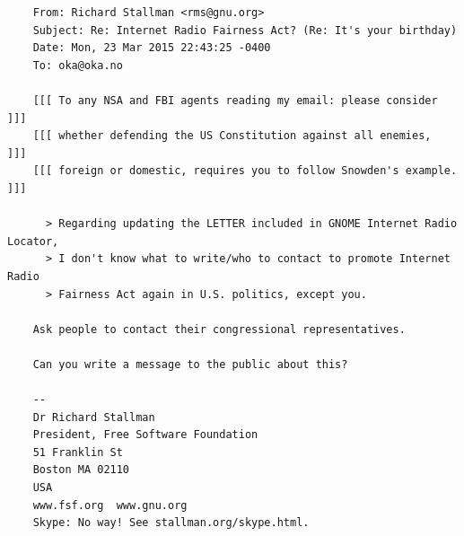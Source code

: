 \documentclass[20pt,landscape]{foils}
\begin{document}
\begin{list1}
\item
  \begin{tiny}
\begin{verbatim}
    From: Richard Stallman <rms@gnu.org>
    Subject: Re: Internet Radio Fairness Act? (Re: It's your birthday)
    Date: Mon, 23 Mar 2015 22:43:25 -0400
    To: oka@oka.no

    [[[ To any NSA and FBI agents reading my email: please consider    ]]]
    [[[ whether defending the US Constitution against all enemies,     ]]]
    [[[ foreign or domestic, requires you to follow Snowden's example. ]]]

      > Regarding updating the LETTER included in GNOME Internet Radio Locator,
      > I don't know what to write/who to contact to promote Internet Radio
      > Fairness Act again in U.S. politics, except you.

    Ask people to contact their congressional representatives.

    Can you write a message to the public about this?

    -- 
    Dr Richard Stallman
    President, Free Software Foundation
    51 Franklin St
    Boston MA 02110
    USA
    www.fsf.org  www.gnu.org
    Skype: No way! See stallman.org/skype.html.
\end{verbatim}
  \end{tiny}
\end{list1}  

\end{document}
